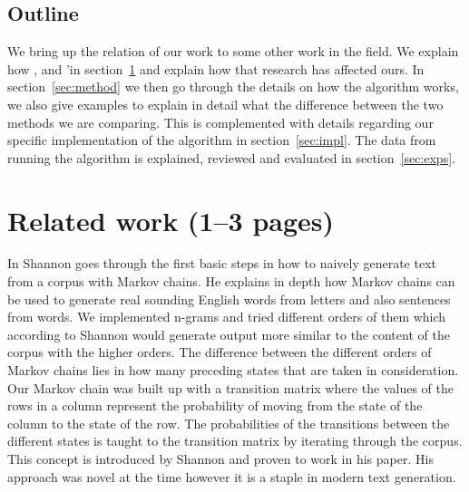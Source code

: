 \documentclass[a4paper,12pt]{article}
\begin{document}
\subsection{Outline}
We bring up the relation of our work to some other work in the field. We explain how \citep{shannon48}, \citep{Corpus} and \cite{McBarb}'in section~\ref{sec:relwork} and explain how that research has affected ours. 
In section~\ref{sec:method} we then go through the details on how the algorithm works, 
we also give examples to explain in detail what the difference between the two methods we are comparing. 
This is complemented with details regarding our specific implementation of the algorithm in section~\ref{sec:impl}. 
The data from running the algorithm is explained, reviewed and evaluated in section~\ref{sec:exps}.

\newpage
\section{Related work (1--3 pages)}
\label{sec:relwork}
%

In \cite{shannon48} Shannon goes through the first basic steps in how to naively generate text from a corpus with Markov chains. 
He explains in depth how Markov chains can be used to generate real sounding English words from letters and also sentences from words. 
We implemented n-grams and tried different orders of them which according to Shannon would generate output more similar to the content of the corpus with the higher orders. 
The difference between the different orders of Markov chains lies in how many preceding states that are taken in consideration.
Our Markov chain was built up with a transition matrix where the values of the rows in a column represent the probability of moving from the state of the column to the state of the row. The probabilities of the transitions between the different states is taught to the transition matrix by iterating through the corpus. This concept is introduced by Shannon and proven to work in his paper.
His approach was novel at the time however it is a staple in modern text generation. 
\end{document}
